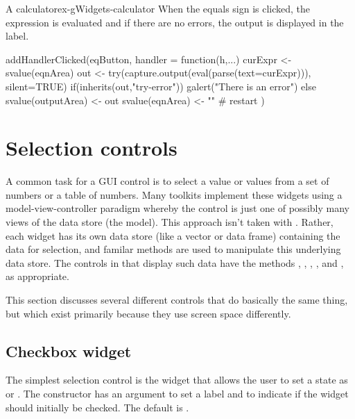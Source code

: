 \begin{example}{A calculator}{ex-gWidgets-calculator}
When the equals sign is clicked, the expression is evaluated and if
there are no errors, the output is displayed in the label.
\begin{Schunk}
\begin{Sinput}
 addHandlerClicked(eqButton, handler = function(h,...) {
   curExpr <- svalue(eqnArea)
   out <- try(capture.output(eval(parse(text=curExpr))), silent=TRUE)
   if(inherits(out,"try-error")) {
     galert("There is an error")
   } else {
     svalue(outputArea) <- out
     svalue(eqnArea) <- ""            # restart
   }
 })
\end{Sinput}
\end{Schunk}

\end{example}

\section{Selection controls}
\label{sec:gWidgets-widg-select-data}

A common task for a GUI control is to select a value or values from a
set of numbers or a table of numbers. Many toolkits implement these
widgets using a model-view-controller paradigm whereby the control is
just one of possibly many views of the data store (the model). This
approach isn't taken with . Rather, each widget has its
own data store (like a vector or data frame)
containing the data for selection, and familar \R\/ methods are used to
manipulate this underlying data store. The controls in  that
display such data have the methods \code{[}, \code{[\ASSIGN},
, ,  and , as
appropriate.

This section discusses several different controls that do basically the
same thing, but which exist primarily because they use screen space differently.


\subsection{Checkbox widget}
\label{sec:gWidgets-checkbox-widget}

The simplest selection control is the  widget
that allows the user to set a state as  or
. The constructor has an argument
 to set a label and
 to indicate if the widget should
initially be checked. The default is .

